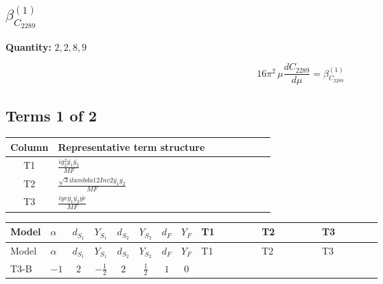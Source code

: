 \documentclass[8pt]{article}
\begin{document}
\begin{landscape}
\section*{$\beta_{C_{2289}}^{(1)}$}
\noindent\textbf{Quantity: }$\mathrm{2,2,8,9}$\par\smallskip
\[16\pi^2\,\mu\frac{d C_{2289}}{d\mu}=\beta_{C_{2289}}^{(1)}\]
\subsection*{Terms 1 of 2}
\begin{center}
\begin{tabular}{@{}c >{\raggedright\arraybackslash}p{0.82\linewidth}@{}}
\toprule
Column & Representative term structure \\
\midrule
T1 & \(\displaystyle \frac{i g_{2}^{2} \overline{y_{1}} \overline{y_{2}}}{MF}\) \\
\midrule
T2 & \(\displaystyle \frac{\sqrt{3} i lambda12Inv2 \overline{y_{1}} \overline{y_{2}}}{MF}\) \\
\midrule
T3 & \(\displaystyle \frac{i ye \overline{y_{1}} \overline{y_{2}} \overline{ye}}{MF}\) \\
\midrule
\bottomrule
\end{tabular}
\end{center}
\smallskip
\tiny
\begin{longtable}{@{}llcccccc >{\raggedright\arraybackslash}p{0.21\linewidth} >{\raggedright\arraybackslash}p{0.21\linewidth} >{\raggedright\arraybackslash}p{0.21\linewidth}@{}}
\toprule
Model & $\alpha$ & $d_{S_1}$ & $Y_{S_1}$ & $d_{S_2}$ & $Y_{S_2}$ & $d_F$ & $Y_F$ & T1 & T2 & T3 \\
\midrule
\endfirsthead
\toprule
Model & $\alpha$ & $d_{S_1}$ & $Y_{S_1}$ & $d_{S_2}$ & $Y_{S_2}$ & $d_F$ & $Y_F$ & T1 & T2 & T3 \\
\midrule
\endhead
T3-B & $-1$ & $2$ & $-\frac{1}{2}$ & $2$ & $\frac{1}{2}$ & $1$ & $0$ & \scriptsize\adjustbox{max width=\linewidth}{$\begin{gathered} - \frac{3 i g_{2}^{2} \overline{y_{1}} \overline{y_{2}}}{4 MF}\end{gathered}$} & \scriptsize\adjustbox{max width=\linewidth}{$\begin{gathered} - \frac{\sqrt{3} i lambda12Inv2 \overline{y_{1}} \overline{y_{2}}}{3 MF}\end{gathered}$} & \scriptsize\adjustbox{max width=\linewidth}{$\begin{gathered} \frac{i ye \overline{y_{1}} \overline{y_{2}} \overline{ye}}{4 MF}\end{gathered}$} \\

\end{longtable}
\end{landscape}
\end{document}
